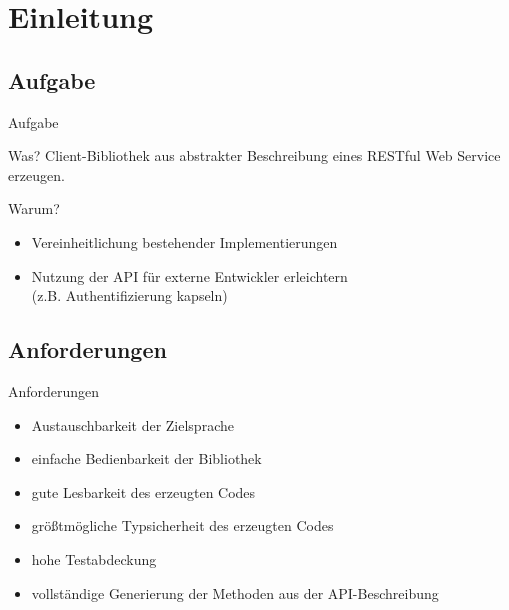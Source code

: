 \section{Einleitung}

\subsection{Aufgabe}
\begin{frame}{Aufgabe}
    \begin{block}{Was?}
        Client-Bibliothek aus abstrakter Beschreibung eines RESTful Web Service erzeugen.
    \end{block}

    \begin{block}{Warum?}
        \begin{itemize}
            \item Vereinheitlichung bestehender Implementierungen
            \item Nutzung der API für externe Entwickler erleichtern\\(z.B. Authentifizierung kapseln)
        \end{itemize}
    \end{block}
\end{frame}

\subsection{Anforderungen}
\begin{frame}{Anforderungen}
    \begin{itemize}
        \item Austauschbarkeit der Zielsprache
        \item einfache Bedienbarkeit der Bibliothek
        \item gute Lesbarkeit des erzeugten Codes
        \item größtmögliche Typsicherheit des erzeugten Codes
        \item {\color{gray} hohe Testabdeckung}
        \item vollständige Generierung der Methoden aus der API-Beschreibung
    \end{itemize}
\end{frame}

